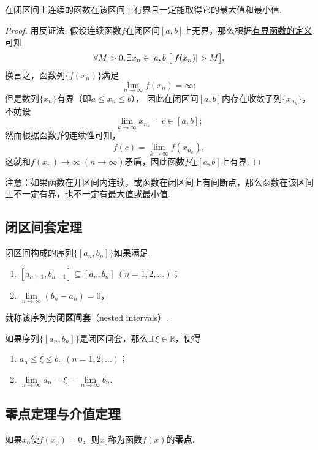\begin{theorem}[有界性与最大值最小值定理]\label{theorem:极限.闭区间上连续函数的性质.有界性与最大值最小值定理}
在闭区间上连续的函数在该区间上有界且一定能取得它的最大值和最小值.
\begin{proof}
用反证法.
假设连续函数\(f\)在闭区间\([a,b]\)上无界，那么根据\hyperref[definition:函数.函数的有界性]{有界函数的定义}可知\[
\forall M>0,
\exists x_n\in[a,b]
\bigl[
\abs{f(x_n)} > M
\bigl],
\]换言之，函数列\(\{f(x_n)\}\)满足\[
\lim\limits_{n\to\infty} f(x_n) = \infty;
\]
但是数列\(\{x_n\}\)有界（即\(a \leqslant x_n \leqslant b\)），%
因此在闭区间\([a,b]\)内存在收敛子列\(\{x_{n_k}\}\)，%
不妨设\[
\lim\limits_{k\to\infty} x_{n_k} = c \in [a,b];
\]
然而根据函数\(f\)的连续性可知，\[
f(c) = \lim\limits_{k\to\infty} f(x_{n_k}),
\]
这就和\(f(x_n)\to\infty\ (n\to\infty)\)矛盾，因此函数\(f\)在\([a,b]\)上有界.
\end{proof}
\end{theorem}
注意：如果函数在开区间内连续，或函数在闭区间上有间断点，那么函数在该区间上不一定有界，也不一定有最大值或最小值.

\subsection{闭区间套定理}
\begin{definition}\label{definition:极限.闭区间套的定义}
闭区间构成的序列\(\{[a_n,b_n]\}\)如果满足
\begin{enumerate}
\item \([a_{n+1},b_{n+1}] \subseteq [a_n,b_n]\ (n=1,2,\dotsc)\)；
\item \(\lim\limits_{n\to\infty} (b_n - a_n) = 0\)，
\end{enumerate}
就称该序列为\textbf{闭区间套}（nested intervals）.
\end{definition}

\begin{theorem}\label{definition:极限.闭区间套定理}
如果序列\(\{[a_n,b_n]\}\)是闭区间套，那么\(\exists!\xi\in\mathbb{R}\)，使得
\begin{enumerate}
\item \(a_n \leqslant \xi \leqslant b_n\ (n=1,2,\dotsc)\)；
\item \(\lim\limits_{n\to\infty} a_n
= \xi
= \lim\limits_{n\to\infty} b_n\).
\end{enumerate}
\end{theorem}

\subsection{零点定理与介值定理}
\begin{definition}
如果\(x_0\)使\(f(x_0) = 0\)，则\(x_0\)称为函数\(f(x)\)的\textbf{零点}.
\end{definition}

